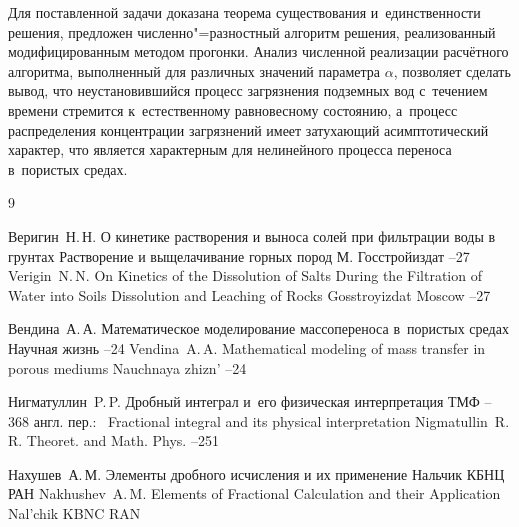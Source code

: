 Для поставленной задачи доказана теорема существования и~единственности решения, предложен численно"=разностный алгоритм решения, реализованный модифицированным методом прогонки. 
Анализ численной реализации расчётного алгоритма, выполненный для различных значений параметра  $\alpha$, позволяет сделать вывод, что неустановившийся процесс загрязнения подземных вод с~течением времени стремится к~естественному 
равновесному состоянию, а~процесс распределения концентрации загрязнений имеет затухающий асимптотический характер, что является характерным для  нелинейного процесса переноса в~пористых средах.



\begin{thebibliography}{9}

\by Веригин~Н.\,Н.
\paper О кинетике растворения и выноса солей при фильтрации воды в грунтах
\inbook Растворение и выщелачивание горных пород
\publaddr М. 
\publ Госстройиздат
--27
\misctransl
\by Verigin~N.\,N.
\by On Kinetics of the Dissolution of Salts During the Filtration of Water into Soils
\inbook Dissolution and Leaching of Rocks 
\publ Gosstroyizdat
\publ Moscow 
--27



\by Вендина~А.\,А.
\paper Математическое моделирование массопереноса в~пористых средах
\jour Научная жизнь
--24
\misctransl 
\by Vendina~A.\,A.
\paper Mathematical modeling of mass transfer in porous mediums
\jour Nauchnaya zhizn'
--24




\by Нигматуллин~P.\,P.
\paper Дробный интеграл и~его физическая интерпретация
\jour ТМФ
--368
\transl англ. пер.:~
\paper Fractional integral and its physical interpretation
\by Nigmatullin~R.\,R.
\jour Theoret. and Math. Phys.
--251



\by Нахушев~А.\,М.
\book  Элементы дробного исчисления и их применение
\publaddr Нальчик
\publ КБНЦ РАН
\misctransl
\by Nakhushev~A.\,M. 
\book Elements of Fractional Calculation and their Application
\publaddr Nal'chik
\publ KBNC RAN

\end{thebibliography}


\noindent
\hskip6.5cm \thedate \par\noindent
\hskip6.5cm\therevdate

\vspace{-7mm}


%

\makeengtitle

\newpage

\renewcommand{\baselinestretch}{0.9}

\newpage
%
%